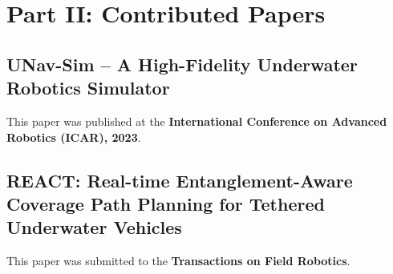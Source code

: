 \documentclass[
10pt, %
b5paper, %
twoside, %
openright  %
]{book}  %
\begin{document}
 
 
 
 
 


 
 
  

%
%
%

% 




\part*{Part II: Contributed Papers}
 \label{partII:paper}



\chapter{UNav-Sim – A High-Fidelity Underwater Robotics Simulator}
\vspace{1cm}
This paper was published at the \textbf{International Conference on Advanced Robotics (ICAR), 2023}.
 



\chapter{REACT: Real-time Entanglement-Aware Coverage
Path Planning for Tethered Underwater Vehicles}
\vspace{1cm}
This paper was submitted to the \textbf{Transactions on Field Robotics}.
 
\end{document}
